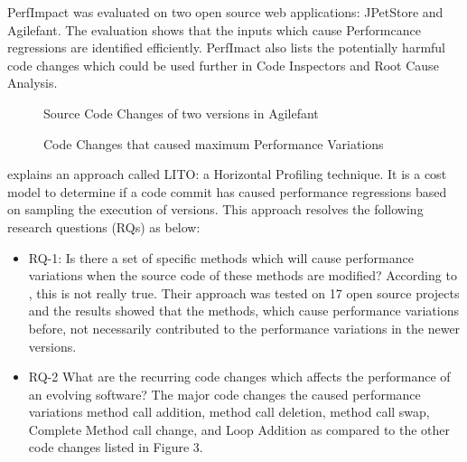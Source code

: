 \documentclass[article,type=msc,colorback,12pt,accentcolor=tud7b]{tudthesis}
\begin{document}
PerfImpact was evaluated on two open source web applications: JPetStore\cite{Jpetstore} and Agilefant\cite{Agilefant}. The evaluation shows that the inputs which cause Performcance regressions are identified efficiently. PerfImact also lists the potentially harmful code changes which could be used further in Code Inspectors and Root Cause Analysis.



 \begin{figure}
 \begin{center}
  \makebox[\textwidth]{\texttt{[image: B1]}}
  \makebox[\textwidth]{\texttt{[image: B2]}}
\end{center}
\caption{Source Code Changes of two versions in Agilefant \cite{luomining}}
\end{figure}

 \begin{figure}
 \begin{center}
  \makebox[\textwidth]{\texttt{[image: B3]}}
\end{center}
\caption{Code Changes that caused maximum Performance Variations \cite{sandoval2016learning}}
\end{figure}

\cite{sandoval2016learning} explains an approach called LITO: a Horizontal Profiling technique. It is a cost model to determine if a code commit has caused performance regressions based on sampling the execution of versions. This approach resolves the following research questions (RQs) as below:

\begin{itemize}

\item RQ-1: Is there a set of specific methods which will cause performance variations when the source code of these methods are modified? According to \cite{sandoval2016learning}, this is not really true. Their approach was tested on 17 open source projects and the results showed that the methods, which cause performance variations before, not necessarily contributed to the performance variations in the newer versions.

\item RQ-2  What are the recurring code changes which affects the performance of an evolving software? The major code changes the caused performance variations method call addition, method call deletion, method call swap, Complete Method call change, and Loop Addition  as compared to the other code changes listed in Figure 3. \cite{sandoval2016learning}

\end{itemize}
	
\end{document}
